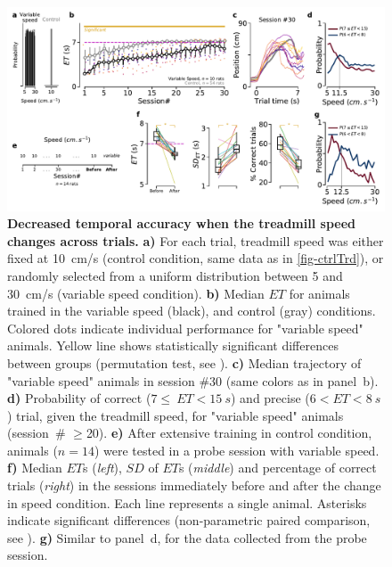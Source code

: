 \begin{figure}[bt!]
  \begin{center}
    \includegraphics[width=.8\linewidth]{ch-time/figures/VarTrd.pdf}
    \caption[Variable speed condition]
    {\textbf{Decreased temporal accuracy when the treadmill speed changes across trials.}
    \textbf{a)}
    For each trial, treadmill speed was either fixed at 10~cm/s (control condition, same data as in \autoref{fig-ctrlTrd}), or randomly selected from a uniform distribution between 5 and 30~cm/s (variable speed condition).
    \textbf{b)}
    Median $ET$ for animals trained in the variable speed (black), and control (gray) conditions.
    Colored dots indicate individual performance for "variable speed" animals.
    Yellow line shows statistically significant differences between groups (permutation test, see ).
    \textbf{c)}
    Median trajectory of "variable speed" animals in session \#30 (same colors as in panel~b).
    \textbf{d)}
    Probability of correct ($7\leq~ET<15~s$) and precise ($6<ET<8~s$) trial, given the treadmill speed, for "variable speed" animals (session~\# $\geq$20).
    \textbf{e)}
    After extensive training in control condition, animals ($n=14$) were tested in a probe session with variable speed.
    \textbf{f)}
    Median $ET$s (\textit{left}), $SD$ of $ET$s (\textit{middle}) and percentage of correct trials (\textit{right}) in the sessions immediately before and after the change in speed condition.
    Each line represents a single animal.
    Asterisks indicate significant differences (non-parametric paired comparison, see ).
    \textbf{g)}
    Similar to panel~d, for the data collected from the probe session.
  }
  \label{fig:time:varTrd}
  \end{center}
\end{figure}
